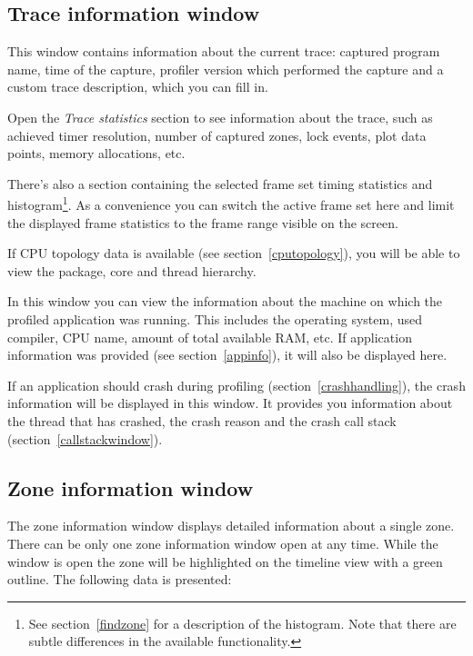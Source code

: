 \documentclass[hidelinks,titlepage,a4paper]{article}
\begin{document}
\subsection{Trace information window}
\label{traceinfo}

This window contains information about the current trace: captured program name, time of the capture, profiler version which performed the capture and a custom trace description, which you can fill in.

Open the \emph{Trace statistics} section to see information about the trace, such as achieved timer resolution, number of captured zones, lock events, plot data points, memory allocations, etc.

There's also a section containing the selected frame set timing statistics and histogram\footnote{See section~\ref{findzone} for a description of the histogram. Note that there are subtle differences in the available functionality.}. As a convenience you can switch the active frame set here and limit the displayed frame statistics to the frame range visible on the screen.

If CPU topology data is available (see section~\ref{cputopology}), you will be able to view the package, core and thread hierarchy.

In this window you can view the information about the machine on which the profiled application was running. This includes the operating system, used compiler, CPU name, amount of total available RAM, etc. If application information was provided (see section~\ref{appinfo}), it will also be displayed here.

If an application should crash during profiling (section~\ref{crashhandling}), the crash information will be displayed in this window. It provides you information about the thread that has crashed, the crash reason and the crash call stack (section~\ref{callstackwindow}).

\subsection{Zone information window}
\label{zoneinfo}

The zone information window displays detailed information about a single zone. There can be only one zone information window open at any time. While the window is open the zone will be highlighted on the timeline view with a green outline. The following data is presented:
\end{document}
